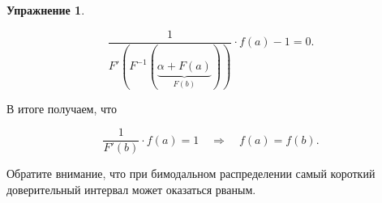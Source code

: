 \documentclass[12pt, a4paper, oneside]{extreport}
\theoremstyle{plain}              %
\theoremstyle{definition}         %
\newtheorem{problem}{\color{myblue} Упражнение}
\begin{document}
\begin{problem}
\begin{sol}
\[ \frac{1}{F'(F^{-1}(\underbrace{\alpha + F(a)}_{F(b)}))} \cdot f(a) - 1 = 0.\]

В итоге получаем, что 

\[\frac{1}{F'(b)} \cdot f(a) = 1 \quad \Rightarrow \quad f(a) = f(b).\]

Обратите внимание, что при бимодальном распределении самый короткий доверительный интервал может оказаться рваным. 

\end{sol}
\end{problem}


%
\end{document}
